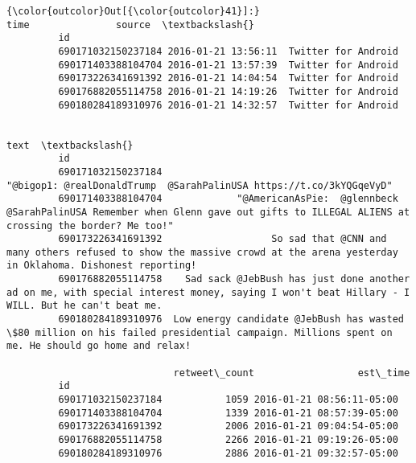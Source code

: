 \documentclass[11pt]{article}
\begin{document}
\begin{Verbatim}[commandchars=\\\{\}]
{\color{outcolor}Out[{\color{outcolor}41}]:}                                   time               source  \textbackslash{}
         id                                                            
         690171032150237184 2016-01-21 13:56:11  Twitter for Android   
         690171403388104704 2016-01-21 13:57:39  Twitter for Android   
         690173226341691392 2016-01-21 14:04:54  Twitter for Android   
         690176882055114758 2016-01-21 14:19:26  Twitter for Android   
         690180284189310976 2016-01-21 14:32:57  Twitter for Android   
         
                                                                                                                                                                     text  \textbackslash{}
         id                                                                                                                                                                 
         690171032150237184                                                                           "@bigop1: @realDonaldTrump  @SarahPalinUSA https://t.co/3kYQGqeVyD"   
         690171403388104704             "@AmericanAsPie:  @glennbeck @SarahPalinUSA Remember when Glenn gave out gifts to ILLEGAL ALIENS at crossing the border? Me too!"   
         690173226341691392                   So sad that @CNN and many others refused to show the massive crowd at the arena yesterday in Oklahoma. Dishonest reporting!   
         690176882055114758    Sad sack @JebBush has just done another ad on me, with special interest money, saying I won't beat Hillary - I WILL. But he can't beat me.   
         690180284189310976  Low energy candidate @JebBush has wasted \$80 million on his failed presidential campaign. Millions spent on me. He should go home and relax!   
         
                             retweet\_count                  est\_time  
         id                                                           
         690171032150237184           1059 2016-01-21 08:56:11-05:00  
         690171403388104704           1339 2016-01-21 08:57:39-05:00  
         690173226341691392           2006 2016-01-21 09:04:54-05:00  
         690176882055114758           2266 2016-01-21 09:19:26-05:00  
         690180284189310976           2886 2016-01-21 09:32:57-05:00  
\end{Verbatim}
            
\end{document}
